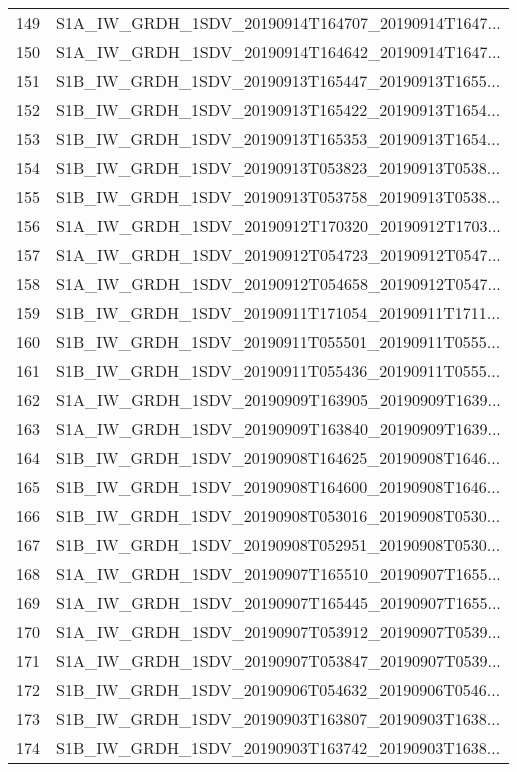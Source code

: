 \begin{tabular}{ll}
149 &  S1A\_IW\_GRDH\_1SDV\_20190914T164707\_20190914T1647... \\
150 &  S1A\_IW\_GRDH\_1SDV\_20190914T164642\_20190914T1647... \\
151 &  S1B\_IW\_GRDH\_1SDV\_20190913T165447\_20190913T1655... \\
152 &  S1B\_IW\_GRDH\_1SDV\_20190913T165422\_20190913T1654... \\
153 &  S1B\_IW\_GRDH\_1SDV\_20190913T165353\_20190913T1654... \\
154 &  S1B\_IW\_GRDH\_1SDV\_20190913T053823\_20190913T0538... \\
155 &  S1B\_IW\_GRDH\_1SDV\_20190913T053758\_20190913T0538... \\
156 &  S1A\_IW\_GRDH\_1SDV\_20190912T170320\_20190912T1703... \\
157 &  S1A\_IW\_GRDH\_1SDV\_20190912T054723\_20190912T0547... \\
158 &  S1A\_IW\_GRDH\_1SDV\_20190912T054658\_20190912T0547... \\
159 &  S1B\_IW\_GRDH\_1SDV\_20190911T171054\_20190911T1711... \\
160 &  S1B\_IW\_GRDH\_1SDV\_20190911T055501\_20190911T0555... \\
161 &  S1B\_IW\_GRDH\_1SDV\_20190911T055436\_20190911T0555... \\
162 &  S1A\_IW\_GRDH\_1SDV\_20190909T163905\_20190909T1639... \\
163 &  S1A\_IW\_GRDH\_1SDV\_20190909T163840\_20190909T1639... \\
164 &  S1B\_IW\_GRDH\_1SDV\_20190908T164625\_20190908T1646... \\
165 &  S1B\_IW\_GRDH\_1SDV\_20190908T164600\_20190908T1646... \\
166 &  S1B\_IW\_GRDH\_1SDV\_20190908T053016\_20190908T0530... \\
167 &  S1B\_IW\_GRDH\_1SDV\_20190908T052951\_20190908T0530... \\
168 &  S1A\_IW\_GRDH\_1SDV\_20190907T165510\_20190907T1655... \\
169 &  S1A\_IW\_GRDH\_1SDV\_20190907T165445\_20190907T1655... \\
170 &  S1A\_IW\_GRDH\_1SDV\_20190907T053912\_20190907T0539... \\
171 &  S1A\_IW\_GRDH\_1SDV\_20190907T053847\_20190907T0539... \\
172 &  S1B\_IW\_GRDH\_1SDV\_20190906T054632\_20190906T0546... \\
173 &  S1B\_IW\_GRDH\_1SDV\_20190903T163807\_20190903T1638... \\
174 &  S1B\_IW\_GRDH\_1SDV\_20190903T163742\_20190903T1638... \\
\bottomrule
\end{tabular}
